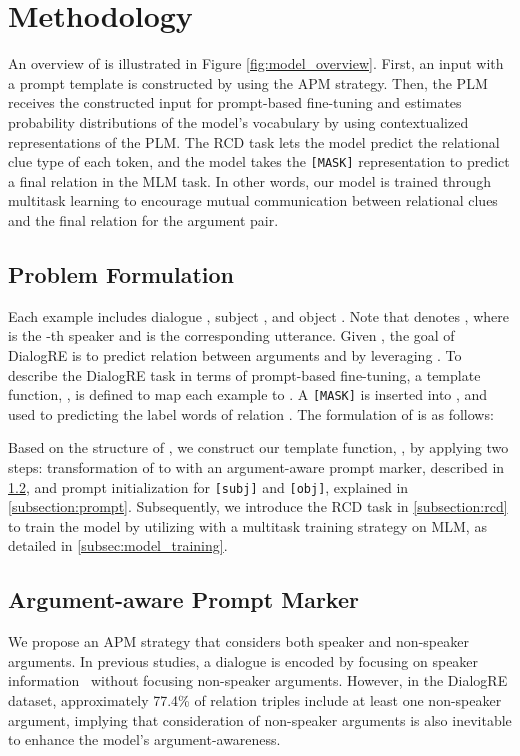 \documentclass[11pt]{article}
\begin{document}
\section{Methodology\label{method}}
An overview of  is illustrated in Figure \ref{fig:model_overview}. First, an input with a prompt template is constructed by using the APM strategy. Then, the PLM receives the constructed input for prompt-based fine-tuning and estimates probability distributions of the model's vocabulary by using contextualized representations of the PLM. The RCD task lets the model predict the relational clue type of each token, and the model takes the \texttt{[MASK]} representation to predict a final relation in the MLM task. In other words, our model is trained through multitask learning to encourage mutual communication between relational clues and the final relation for the argument pair.

\subsection{Problem Formulation}
\label{subsec:problem_formulation}
Each example  includes dialogue , subject , and object . Note that  denotes , where  is the -th speaker and  is the corresponding utterance. Given , the goal of DialogRE is to predict relation  between arguments  and  by leveraging . To describe the DialogRE task in terms of prompt-based fine-tuning, a template function, , is defined to map each example to . 
A \texttt{[MASK]} is inserted into , and used to predicting the label words of relation . The formulation of  is as follows:

Based on the structure of , we construct our template function, , 
by applying two steps: transformation of  to  with an argument-aware prompt marker, described in \ref{subsection:encoding}, and prompt initialization for \texttt{[subj]} and \texttt{[obj]}, explained in \ref{subsection:prompt}. Subsequently, we introduce the RCD task in \ref{subsection:rcd} to train the model by utilizing  with a multitask training strategy on MLM, as detailed in \ref{subsec:model_training}.


\subsection{Argument-aware Prompt Marker}
\label{subsection:encoding}

We propose an APM strategy that considers both speaker and non-speaker arguments. 
In previous studies, a dialogue is encoded by focusing on speaker information~\citep{lee-choi-2021-graph,yu-etal-2020-dialogue,chen2021knowprompt} without focusing non-speaker arguments. However, in the DialogRE dataset, approximately 77.4\% of relation triples include at least one non-speaker argument, implying that consideration of non-speaker arguments is also inevitable to enhance the model's argument-awareness.
\end{document}
